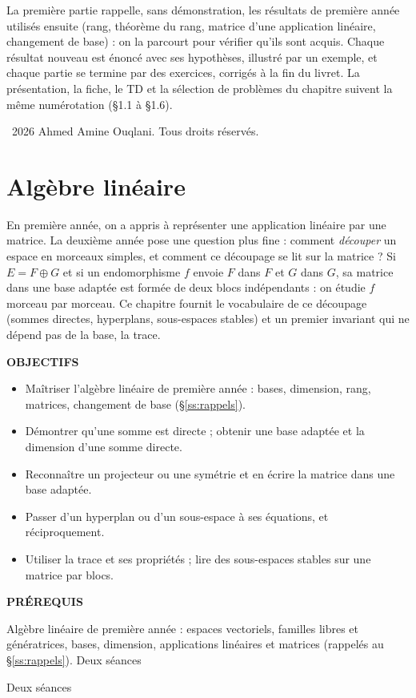 \documentclass[a4paper,11pt]{article}
\numberwithin{equation}{section}
\numberwithin{figure}{section}
\numberwithin{table}{section}
\theoremstyle{enonce}
\theoremstyle{exemple}
\theoremstyle{remarque}
\newcommand{\ouverture}[3]{%
  \begin{tcolorbox}[enhanced,colback=Fond,colframe=Fond,arc=0pt,boxrule=0pt,left=12pt,right=12pt,top=10pt,bottom=10pt,
     before skip=1.2em,after skip=1.6em]
  \begin{minipage}[t]{0.56\linewidth}
  {\sffamily\bfseries\small\color{Bleu}OBJECTIFS}\par\vspace{0.3em}\small #1
  \end{minipage}\hfill
  \begin{minipage}[t]{0.38\linewidth}
  {\sffamily\bfseries\small\color{Bleu}PRÉREQUIS}\par\vspace{0.3em}\small #2
  \ifx\relax#3\relax\else\par\vspace{0.6em}{\sffamily\bfseries\small\color{Bleu}DURÉE}\par\vspace{0.2em}\small #3\fi
  \end{minipage}
  \end{tcolorbox}}
\newif\ifonglets \ongletsfalse
\begin{document}
La première partie rappelle, sans démonstration, les résultats de première année utilisés ensuite (rang, théorème du rang,
matrice d'une application linéaire, changement de base) : on la parcourt pour vérifier qu'ils sont acquis. Chaque résultat
nouveau est énoncé avec ses hypothèses, illustré par un exemple, et chaque partie se termine par des exercices, corrigés à la fin
du livret. La présentation, la fiche, le TD et la sélection de problèmes du chapitre suivent la même numérotation (§1.1 à §1.6).

\vfill
{\footnotesize\sffamily\color{Gris}\textcopyright~2026 Ahmed Amine Ouqlani. Tous droits réservés.\par}
\clearpage
\thispagestyle{plain}
\hypertarget{toc}{}
\renewcommand{\contentsname}{Sommaire}
\tableofcontents
\clearpage
{}
\ongletstrue
\clearpage
\section{Algèbre linéaire}\label{sec:al}

En première année, on a appris à représenter une application linéaire par une matrice. La deuxième année pose une question plus
fine : comment \emph{découper} un espace en morceaux simples, et comment ce découpage se lit sur la matrice ? Si
$E=F\oplus G$ et si un endomorphisme $f$ envoie $F$ dans $F$ et $G$ dans $G$, sa matrice dans une base adaptée est formée de deux
blocs indépendants : on étudie $f$ morceau par morceau. Ce chapitre fournit le vocabulaire de ce découpage (sommes directes,
hyperplans, sous-espaces stables) et un premier invariant qui ne dépend pas de la base, la trace.

\ouverture{%
\begin{itemize}[leftmargin=1.1em,itemsep=1pt]
\item Maîtriser l'algèbre linéaire de première année : bases, dimension, rang, matrices, changement de base (§\ref{ss:rappels}).
\item Démontrer qu'une somme est directe ; obtenir une base adaptée et la dimension d'une somme directe.
\item Reconnaître un projecteur ou une symétrie et en écrire la matrice dans une base adaptée.
\item Passer d'un hyperplan ou d'un sous-espace à ses équations, et réciproquement.
\item Utiliser la trace et ses propriétés ; lire des sous-espaces stables sur une matrice par blocs.
\end{itemize}}{%
Algèbre linéaire de première année : espaces vectoriels, familles libres et génératrices, bases, dimension, applications
linéaires et matrices (rappelés au §\ref{ss:rappels}).}{Deux séances}
\end{document}
